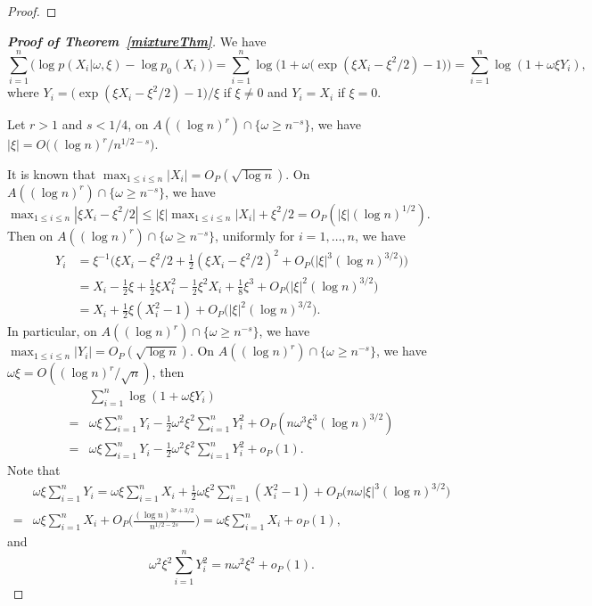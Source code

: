 \documentclass[11pt]{article}
\theoremstyle{plain}
\theoremstyle{definition}
\theoremstyle{remark}
\begin{document}
\begin{appendices}
\begin{proof}
\end{proof}


\begin{proof}[\textbf{Proof of Theorem~\ref{mixtureThm}}]
We have
\begin{equation*}
    \sum_{i=1}^n \big(\log p(X_i|\omega,\xi)-\log p_0(X_i)\big)
    =\sum_{i=1}^n \log\Big(1+\omega \big(\exp(\xi X_i -\xi^2/2)-1\big)\Big)=\sum_{i=1}^n \log(1+\omega \xi Y_i),
\end{equation*}
where
$
Y_i=\big(\exp(\xi X_i -\xi^2/2)-1\big)/\xi
$ if $\xi \neq 0$ and $Y_i=X_i$ if $\xi =0$.

Let $r>1$ and $s< 1/4$, on $A((\log n)^r)\cap \{\omega\geq n^{-s}\}$,
we have $|\xi| = O\big((\log n)^{r}/n^{1/2-s}\big)$.

It is known that $\max_{1\leq i \leq n}|X_i|=O_P(\sqrt{\log n})$.
On $A((\log n)^r)\cap \{\omega\geq n^{-s}\}$, we have $\max_{1\leq i\leq n}|\xi X_i-\xi^2/2|\leq |\xi| \max_{1\leq i\leq n}|X_i|+\xi^2/2=O_P(|\xi|(\log n)^{1/2})$.
Then on $A((\log n)^r)\cap \{\omega\geq n^{-s}\}$, uniformly for $i=1,\ldots, n$, we have
\begin{align*}
    Y_i&=\xi^{-1}\Big(\xi X_i-\xi^2/2 +\frac{1}{2}(\xi X_i-\xi^2/2)^2+O_P \big(|\xi|^3 (\log n)^{3/2}\big)\Big) 
    \\
    &=X_i-\frac{1}{2}\xi+\frac{1}{2} \xi X_i^2-\frac{1}{2} \xi^2 X_i +\frac{1}{8}\xi^3+O_P \big(|\xi|^2 (\log n)^{3/2}\big)
    \\
    &=X_i+\frac{1}{2} \xi (X_i^2-1) + O_P \big(|\xi|^2 (\log n)^{3/2}\big).
\end{align*}
In particular, on $A((\log n)^r)\cap \{\omega\geq n^{-s}\}$, we have $\max_{1\leq i \leq n}|Y_i|=O_P(\sqrt{\log n})$.
On $A((\log n)^r)\cap \{\omega\geq n^{-s}\}$, we have $\omega \xi =O((\log n)^r /\sqrt{n})$, then
\begin{align*}
    &\sum_{i=1}^n \log(1+\omega \xi Y_i)
    \\
    =& \omega \xi\sum_{i=1}^n Y_i -\frac{1}{2} \omega^2 \xi^2 \sum_{i=1}^n Y_i^2+O_P(n\omega^3 \xi^3 (\log n)^{3/2})
    \\
    =& \omega \xi\sum_{i=1}^n Y_i -\frac{1}{2} \omega^2 \xi^2 \sum_{i=1}^n Y_i^2+o_P(1).
\end{align*}
Note that
\begin{align*}
    &\omega \xi\sum_{i=1}^n Y_i
    =
    \omega \xi\sum_{i=1}^n 
    X_i+\frac{1}{2} \omega \xi^2\sum_{i=1}^n (X_i^2-1) + O_P \big(n\omega |\xi|^3 (\log n)^{3/2}\big)
    \\
    =&
    \omega \xi\sum_{i=1}^n X_i + O_P\Big( \frac{(\log n)^{3r+3/2}}{n^{1/2-2s}}\Big)
=
\omega \xi\sum_{i=1}^n X_i + o_P(1),
\end{align*}
and
\begin{equation*}
    \omega^2 \xi^2 \sum_{i=1}^n Y_i^2=n\omega^2 \xi^2 +o_P(1).
\end{equation*}


\end{proof}
\end{appendices}
\end{document}
